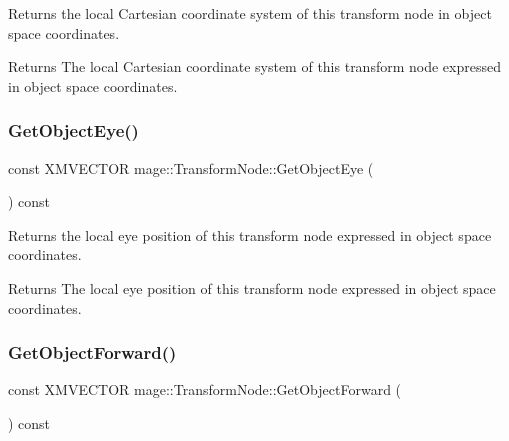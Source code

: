 Returns the local Cartesian coordinate system of this transform node in object space coordinates.

\begin{DoxyReturn}{Returns}
The local Cartesian coordinate system of this transform node expressed in object space coordinates. 
\end{DoxyReturn}
\hypertarget{structmage_1_1_transform_node_a627c3494fb3bd47551bbc48ad64369f5}{}\label{structmage_1_1_transform_node_a627c3494fb3bd47551bbc48ad64369f5} 
\subsubsection{\texorpdfstring{Get\+Object\+Eye()}{GetObjectEye()}}
{\footnotesize\ttfamily const X\+M\+V\+E\+C\+T\+OR mage\+::\+Transform\+Node\+::\+Get\+Object\+Eye (\begin{DoxyParamCaption}{ }\end{DoxyParamCaption}) const\hspace{0.3cm}{\ttfamily [noexcept]}}

Returns the local eye position of this transform node expressed in object space coordinates.

\begin{DoxyReturn}{Returns}
The local eye position of this transform node expressed in object space coordinates. 
\end{DoxyReturn}
\hypertarget{structmage_1_1_transform_node_a4340e1f87d15589e3d763c0f124037bd}{}\label{structmage_1_1_transform_node_a4340e1f87d15589e3d763c0f124037bd} 
\subsubsection{\texorpdfstring{Get\+Object\+Forward()}{GetObjectForward()}}
{\footnotesize\ttfamily const X\+M\+V\+E\+C\+T\+OR mage\+::\+Transform\+Node\+::\+Get\+Object\+Forward (\begin{DoxyParamCaption}{ }\end{DoxyParamCaption}) const\hspace{0.3cm}{\ttfamily [noexcept]}}

